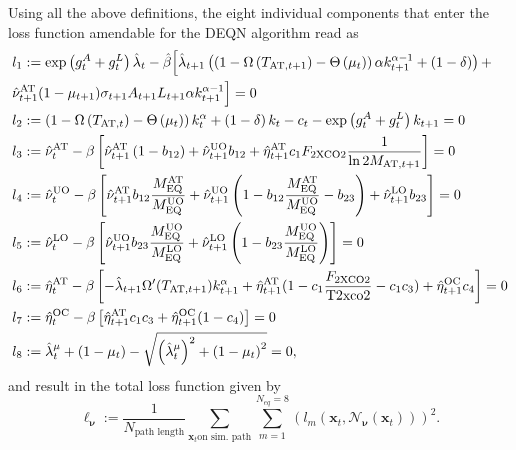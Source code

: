 \documentclass[11pt, a4paper, pdftex, twoside, dvipsnames]{article}
\newcommand{\nn}{\mathcal{N}_{\bm{\nu}}}
\newcommand{\x}{\mathbf{x}}
\begin{document}
\begin{appendices}
Using all the above definitions, the eight individual components that enter the loss function amendable for the DEQN algorithm read as
%
\begin{align}
  \label{eq:CDICE_foc_kplus_ALunit}
 & \nonumber l_1:=\exp\left(g^{A}_{t}+g^{L}_{t}\right)\hat{\lambda}_t - \hat{\beta} \Bigl[\hat{\lambda}_{t+1}             \left(\left(1 - \Omega\left(T_{\text{AT},t+1}\right)-\Theta\left(\mu_{t}\right)\right) \alpha k^{\alpha-1}_{t+1} + \left(1-\delta\right) \right) + \\
 & \hat{\nu}_{t+1}^{\text{AT}} (1-\mu_{t+1}) \sigma_{t+1} A_{t+1}L_{t+1} \alpha k^{\alpha-1}_{t+1} \Bigr] =0 \\
%
  \label{eq:CDICE_foc_lambda_ALunit}
& l_2:=\left(1 - \Omega\left(T_{\text{AT},t}\right)-\Theta\left(\mu_{t}\right)\right)k_{t}^{\alpha}
    + \left(1-\delta\right)k_{t}
    - c_{t} - \exp\left(g^{A}_{t}+g^{L}_{t}\right)k_{t+1} = 0 \\
  \label{eq:CDICE_foc_MAT_ALunit}
&l_3:=  \hat{\nu}_t^{\text{AT}} - \beta \left[\hat{\nu}_{t+1}^{\text{AT}} \left(1 - b_{12} \right) + \hat{\nu}_{t+1}^{\text{UO}} b_{12} + \hat{\eta}_{t+1}^{\text{AT}} c_1 F_{\text{2XCO2}} \frac{1}{\ln2 M_{\text{AT},t+1}} \right] = 0 \\
\label{eq:CDICE_foc_MUO_ALunit}
& l_4:=\hat{\nu}_t^{\text{UO}} - \beta \left[\hat{\nu}_{t+1}^{\text{AT}} b_{12} \frac{M^{\text{AT}}_{\text{EQ}}}{M^{\text{UO}}_{\text{EQ}}} + \hat{\nu}_{t+1}^{\text{UO}} \left(1 - b_{12} \frac{M^{\text{AT}}_{\text{EQ}}}{M^{\text{UO}}_{\text{EQ}}} - b_{23}\right) + \hat{\nu}_{t+1}^{\text{LO}} b_{23} \right] = 0 \\
\label{eq:CDICE_foc_MLO_ALunit}
& l_5:=\hat{\nu}_t^{\text{LO}} - \beta \left[\hat{\nu}_{t+1}^{\text{UO}} b_{23} \frac{M^{\text{UO}}_{\text{EQ}}}{M^{\text{LO}}_{\text{EQ}}} + \hat{\nu}_{t+1}^{\text{LO}} \left(1 - b_{23} \frac{M^{\text{UO}}_{\text{EQ}}}{M^{\text{LO}}_{\text{EQ}}} \right) \right] = 0 \\
\label{eq:CDICE_foc_TAT_ALunit}
& l_6:=\hat{\eta}_t^{\text{AT}} - \beta \left[-\hat{\lambda}_{t+1}  \Omega^{\prime}(T_{\text{AT},t+1}) k^{\alpha}_{t+1} + \hat{\eta}_{t+1}^{\text{AT}} (1-c_1\frac{F_{\text{2XCO2}}}{\text{T2xco2}} - c_1 c_3) + \hat{\eta}_{t+1}^{\text{OC}} c_{4}  \right] =0 \\
\label{eq:CDICE_foc_TOC_ALunit}
& l_7:= \hat{\eta}_t^{\text{OC}} - \beta \left[\hat{\eta}_{t+1}^{\text{AT}}  c_1 c_{3}  +  \hat{\eta}_{t+1}^{\text{OC}}  (1 - c_{4})\right]= 0\\
%
\label{eq:CDICE_kkt_FB_ALunit}
&l_8:= \hat{\lambda}^{\mu}_{t} + \left(1 - \mu_{t}\right) -
  \sqrt{\left(\hat{\lambda}^{\mu}_{t} \right)^2 + \left(1-\mu_{t}\right)^{2}} = 0 ,
%
\end{align}
%
and result in the total loss function given by
%
\begin{equation}
\ell_{\bm{\nu}}:= \frac{1}{N_{\text{path length}}}\sum_{\x_t \text{on sim. path}}\sum_{m=1}^{N_{eq}=8}\left(l_{m}(\x_t, \nn(\x_t))\right)^2 .
\label{eq:loss_function_DEQN_final}
\end{equation}


\end{appendices}
\end{document}
